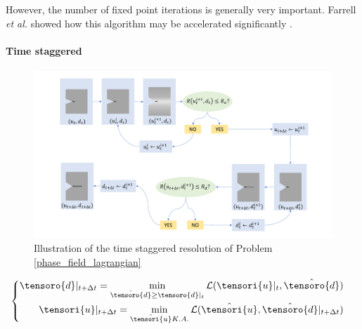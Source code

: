 However, the number of fixed point iterations is generally very
important. Farrell \textit{et al.} showed how this algorithm may be accelerated
significantly \cite{farrell_linear_2017}.

\paragraph{Time staggered}



\begin{figure}[h!]
    \centering
    \includegraphics[width=7.cm]{img/time-staggered-resolution.pdf}
    \caption{Illustration of the time staggered resolution of Problem \ref{phase_field_lagrangian}}
    \label{time_staggered_resolution}
\end{figure}


\begin{equation}
    \begin{cases}
        \begin{aligned}
            \tensoro{d}\vert_{t + \Delta t} = \min_{\hat{\tensoro{d}} \geq \tensoro{d}\vert_{t}}
            \mathcal{L}(\tensori{u}\vert_{t}, \hat{\tensoro{d}})
            \\
            \tensori{u}\vert_{t + \Delta t} = \min_{\hat{\tensori{u}} K.A.}
            \mathcal{L}(\hat{\tensori{u}}, \hat{\tensoro{d}}\vert_{t+ \Delta t})
        \end{aligned}
    \end{cases}
\end{equation}

